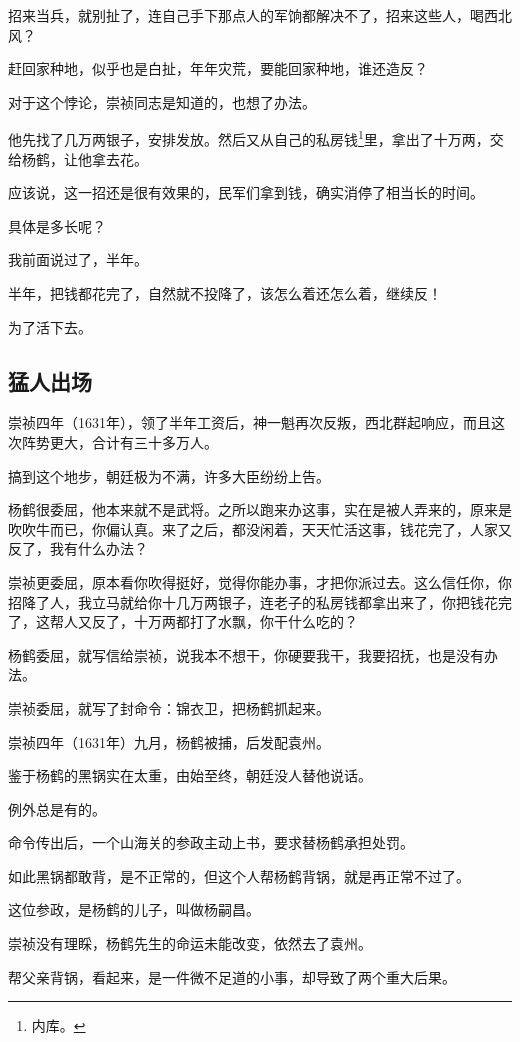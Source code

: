 \begin{multicols}{\theparacolNo}
招来当兵，就别扯了，连自己手下那点人的军饷都解决不了，招来这些人，喝西北风？

赶回家种地，似乎也是白扯，年年灾荒，要能回家种地，谁还造反？

对于这个悖论，崇祯同志是知道的，也想了办法。

他先找了几万两银子，安排发放。然后又从自己的私房钱\footnote{内库。}里，拿出了十万两，交给杨鹤，让他拿去花。

应该说，这一招还是很有效果的，民军们拿到钱，确实消停了相当长的时间。

具体是多长呢？

我前面说过了，半年。

半年，把钱都花完了，自然就不投降了，该怎么着还怎么着，继续反！

为了活下去。

\subsection{猛人出场}
崇祯四年（1631年），领了半年工资后，神一魁再次反叛，西北群起响应，而且这次阵势更大，合计有三十多万人。

搞到这个地步，朝廷极为不满，许多大臣纷纷上告。

杨鹤很委屈，他本来就不是武将。之所以跑来办这事，实在是被人弄来的，原来是吹吹牛而已，你偏认真。来了之后，都没闲着，天天忙活这事，钱花完了，人家又反了，我有什么办法？

崇祯更委屈，原本看你吹得挺好，觉得你能办事，才把你派过去。这么信任你，你招降了人，我立马就给你十几万两银子，连老子的私房钱都拿出来了，你把钱花完了，这帮人又反了，十万两都打了水飘，你干什么吃的？

杨鹤委屈，就写信给崇祯，说我本不想干，你硬要我干，我要招抚，也是没有办法。

崇祯委屈，就写了封命令：锦衣卫，把杨鹤抓起来。

崇祯四年（1631年）九月，杨鹤被捕，后发配袁州。

鉴于杨鹤的黑锅实在太重，由始至终，朝廷没人替他说话。

例外总是有的。

命令传出后，一个山海关的参政主动上书，要求替杨鹤承担处罚。

如此黑锅都敢背，是不正常的，但这个人帮杨鹤背锅，就是再正常不过了。

这位参政，是杨鹤的儿子，叫做杨嗣昌。

崇祯没有理睬，杨鹤先生的命运未能改变，依然去了袁州。

帮父亲背锅，看起来，是一件微不足道的小事，却导致了两个重大后果。


\end{multicols}
